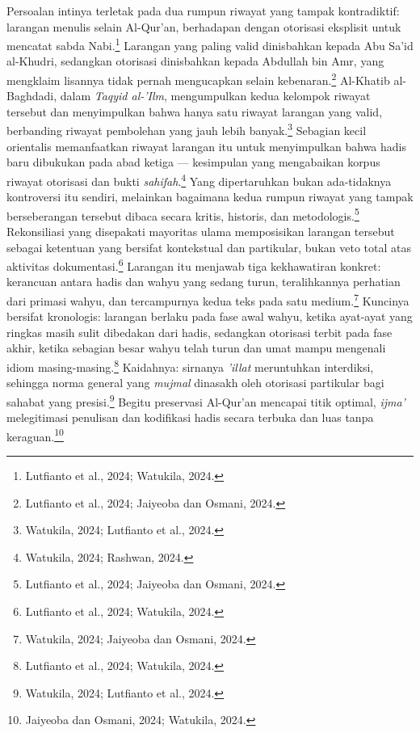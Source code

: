 Persoalan intinya terletak pada dua rumpun riwayat yang tampak kontradiktif: larangan menulis selain Al-Qur'an, berhadapan dengan otorisasi eksplisit untuk mencatat sabda Nabi.\footnote{Lutfianto et al., 2024; Watukila, 2024.} Larangan yang paling valid dinisbahkan kepada Abu Sa'id al-Khudri, sedangkan otorisasi dinisbahkan kepada Abdullah bin Amr, yang mengklaim lisannya tidak pernah mengucapkan selain kebenaran.\footnote{Lutfianto et al., 2024; Jaiyeoba dan Osmani, 2024.} Al-Khatib al-Baghdadi, dalam \textit{Taqyid al-'Ilm}, mengumpulkan kedua kelompok riwayat tersebut dan menyimpulkan bahwa hanya satu riwayat larangan yang valid, berbanding riwayat pembolehan yang jauh lebih banyak.\footnote{Watukila, 2024; Lutfianto et al., 2024.} Sebagian kecil orientalis memanfaatkan riwayat larangan itu untuk menyimpulkan bahwa hadis baru dibukukan pada abad ketiga --- kesimpulan yang mengabaikan korpus riwayat otorisasi dan bukti \textit{sahifah}.\footnote{Watukila, 2024; Rashwan, 2024.} Yang dipertaruhkan bukan ada-tidaknya kontroversi itu sendiri, melainkan bagaimana kedua rumpun riwayat yang tampak berseberangan tersebut dibaca secara kritis, historis, dan metodologis.\footnote{Lutfianto et al., 2024; Jaiyeoba dan Osmani, 2024.} Rekonsiliasi yang disepakati mayoritas ulama memposisikan larangan tersebut sebagai ketentuan yang bersifat kontekstual dan partikular, bukan veto total atas aktivitas dokumentasi.\footnote{Lutfianto et al., 2024; Watukila, 2024.} Larangan itu menjawab tiga kekhawatiran konkret: kerancuan antara hadis dan wahyu yang sedang turun, teralihkannya perhatian dari primasi wahyu, dan tercampurnya kedua teks pada satu medium.\footnote{Watukila, 2024; Jaiyeoba dan Osmani, 2024.} Kuncinya bersifat kronologis: larangan berlaku pada fase awal wahyu, ketika ayat-ayat yang ringkas masih sulit dibedakan dari hadis, sedangkan otorisasi terbit pada fase akhir, ketika sebagian besar wahyu telah turun dan umat mampu mengenali idiom masing-masing.\footnote{Lutfianto et al., 2024; Watukila, 2024.} Kaidahnya: sirnanya \textit{'illat} meruntuhkan interdiksi, sehingga norma general yang \textit{mujmal} dinasakh oleh otorisasi partikular bagi sahabat yang presisi.\footnote{Watukila, 2024; Lutfianto et al., 2024.} Begitu preservasi Al-Qur'an mencapai titik optimal, \textit{ijma'} melegitimasi penulisan dan kodifikasi hadis secara terbuka dan luas tanpa keraguan.\footnote{Jaiyeoba dan Osmani, 2024; Watukila, 2024.}

